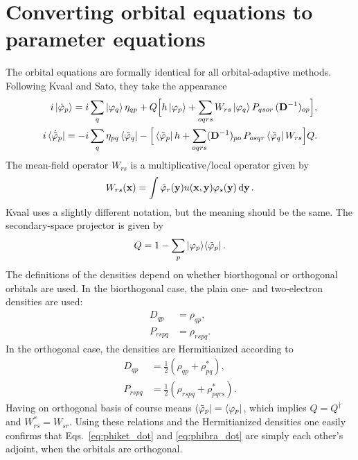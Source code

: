 \documentclass[aip,jcp,preprint,superscriptaddress,nofootinbib]{revtex4-1}
\begin{document}
\section{Converting orbital equations to parameter equations}
The orbital equations are formally identical for all orbital-adaptive methods.
Following Kvaal\cite{kvaalInitioQuantumDynamics2012} and Sato\cite{satoCommunicationTimedependentOptimized2018}, 
they take the appearance
\begin{align}
    i \ket{\dot{\varphi}_{p}} 
    = i \sum_{q} \ket{\varphi_{q}} \eta_{qp}
    + Q \Big[
    h \ket{\varphi_{p}} + \sum_{oqrs} W_{rs} \ket{\varphi_{q}} P_{qsor} \, (\mathbf{D}^{-1})_{op}
    \Big], \label{eq:phiket_dot} \\
    i \bra{\dot{\tilde{\varphi}}_{p}} 
    = -i \sum_{q} \eta_{pq} \bra{\tilde{\varphi}_{q}} -
    \Big[
    \bra{\tilde{\varphi}_{p}} h + \sum_{oqrs} (\mathbf{D}^{-1})_{po} \, P_{osqr}  \bra{\tilde{\varphi}_{q}} W_{rs} 
    \Big] Q. \label{eq:phibra_dot}
\end{align}
The mean-field operator\cite{miyagiTimedependentRestrictedactivespaceSelfconsistentfield2013,satoTimedependentCompleteactivespaceSelfconsistentfield2013}
$W_{rs}$ is a multiplicative/local operator given by
\begin{align}
    W_{rs} (\mathbf{x}) = \int \tilde{\varphi}_{r} (\mathbf{y}) u(\mathbf{x}, \mathbf{y}) \varphi_{s} (\mathbf{y}) \dd{\mathbf{y}}.
\end{align}
Kvaal\cite{kvaalInitioQuantumDynamics2012} uses a slightly different notation, but the meaning should be the same. 
The secondary-space projector is given by
\begin{align}
    Q = 1 - \sum_{p} \ket{\varphi_{p}} \! \bra{\tilde{\varphi}_{p}}.
\end{align}
The definitions of the densities depend on whether biorthogonal\cite{kvaalInitioQuantumDynamics2012}
or orthogonal\cite{satoTimedependentCompleteactivespaceSelfconsistentfield2013} orbitals are used.
In the biorthogonal case, the plain one- and two-electron densities are used:
\begin{align}
    D_{qp}   &= \rho_{qp}, \\
    P_{rspq} &= \rho_{rspq}.
\end{align}
In the orthogonal case, the densities are Hermitianized according to
\begin{align}
    D_{qp}   &= \tfrac{1}{2} ( \rho_{qp}   + \rho_{pq}^*   ), \\
    P_{rspq} &= \tfrac{1}{2} ( \rho_{rspq} + \rho_{pqrs}^* ).
\end{align}
Having on orthogonal basis of course means $\bra{\tilde{\varphi}_{p}} = \bra{\varphi_{p}}$,
which implies $Q = Q^{\dagger}$ and $W_{rs}^* = W_{sr}$. Using these relations
and the Hermitianized densities one easily confirms that Eqs.~\eqref{eq:phiket_dot}
and \eqref{eq:phibra_dot} are simply each other's adjoint,
when the orbitals are orthogonal.
\end{document}
